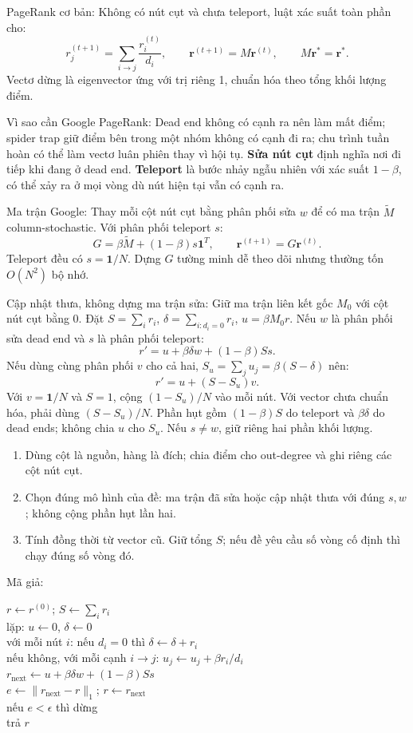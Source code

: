 \documentclass[10pt,a4paper,twocolumn]{article}
\makeatletter
\newcommand{\key}[1]{#1:\enspace}
\newcommand{\steps}[1]{\begin{enumerate}[label=\arabic*.,leftmargin=1.5em,itemsep=1pt,topsep=2pt]#1\end{enumerate}}
\newenvironment{algpseudo}{%
  \par\addvspace{2pt}\noindent
  \setlength{\parskip}{0pt}%
  Mã giả:\par\nobreak
  \begin{list}{}{\setlength{\leftmargin}{1em}\setlength{\topsep}{0pt}%
    \setlength{\partopsep}{0pt}\setlength{\parsep}{0pt}%
    \@beginparpenalty=10000\relax}%
  \item\relax
}{\end{list}\par\addvspace{3pt}}
\makeatother
\begin{document}
\key{PageRank cơ bản} Không có nút cụt và chưa teleport, luật xác suất toàn phần cho:
\[
r_j^{(t+1)}=\sum_{i\to j}\frac{r_i^{(t)}}{d_i},\qquad
\mathbf r^{(t+1)}=M\mathbf r^{(t)},\qquad M\mathbf r^*=\mathbf r^*.
\]
Vectơ dừng là eigenvector ứng với trị riêng 1, chuẩn hóa theo tổng khối lượng điểm.

\key{Vì sao cần Google PageRank} Dead end không có cạnh ra nên làm mất điểm; spider trap giữ điểm bên trong một nhóm không có cạnh đi ra; chu trình tuần hoàn có thể làm vectơ luân phiên thay vì hội tụ. \textbf{Sửa nút cụt} định nghĩa nơi đi tiếp khi đang ở dead end. \textbf{Teleport} là bước nhảy ngẫu nhiên với xác suất $1-\beta$, có thể xảy ra ở mọi vòng dù nút hiện tại vẫn có cạnh ra.

\key{Ma trận Google} Thay mỗi cột nút cụt bằng phân phối sửa $w$ để có ma trận $\widetilde M$ column-stochastic. Với phân phối teleport $s$:
\[
G=\beta\widetilde M+(1-\beta)s\mathbf1^T,\qquad
\mathbf r^{(t+1)}=G\mathbf r^{(t)}.
\]
Teleport đều có $s=\mathbf1/N$. Dựng $G$ tường minh dễ theo dõi nhưng thường tốn $O(N^2)$ bộ nhớ.

\key{Cập nhật thưa, không dựng ma trận sửa} Giữ ma trận liên kết gốc $M_0$ với cột nút cụt bằng 0. Đặt $S=\sum_i r_i$, $\delta=\sum_{i:d_i=0}r_i$, $u=\beta M_0r$. Nếu $w$ là phân phối sửa dead end và $s$ là phân phối teleport:
\[
\boxed{r'=u+\beta\delta w+(1-\beta)S s.}
\]
Nếu dùng cùng phân phối $v$ cho cả hai, $S_u=\sum_j u_j=\beta(S-\delta)$ nên:
\[
\boxed{r'=u+(S-S_u)v.}
\]
Với $v=\mathbf1/N$ và $S=1$, cộng $(1-S_u)/N$ vào mỗi nút. Với vector chưa chuẩn hóa, phải dùng $(S-S_u)/N$. Phần hụt gồm $(1-\beta)S$ do teleport và $\beta\delta$ do dead ends; không chia $u$ cho $S_u$. Nếu $s\ne w$, giữ riêng hai phần khối lượng.

\steps{
\item Dùng cột là nguồn, hàng là đích; chia điểm cho out-degree và ghi riêng các cột nút cụt.
\item Chọn đúng mô hình của đề: ma trận đã sửa hoặc cập nhật thưa với đúng $s,w$; không cộng phần hụt lần hai.
\item Tính đồng thời từ vector cũ. Giữ tổng $S$; nếu đề yêu cầu số vòng cố định thì chạy đúng số vòng đó.
}

\begin{algpseudo}
$r\gets r^{(0)}$; $S\gets\sum_i r_i$\\
 lặp: $u\gets0$, $\delta\gets0$\\
 với mỗi nút $i$: nếu $d_i=0$ thì $\delta\gets\delta+r_i$\\
 \quad nếu không, với mỗi cạnh $i\to j$: $u_j\gets u_j+\beta r_i/d_i$\\
 $r_{\mathrm{next}}\gets u+\beta\delta w+(1-\beta)S s$\\
 $e\gets\|r_{\mathrm{next}}-r\|_1$; $r\gets r_{\mathrm{next}}$\\
 nếu $e<\epsilon$ thì dừng\\
trả $r$
\end{algpseudo}
\end{document}
